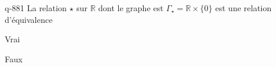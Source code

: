 \begin{truefalse}{q-881}
La relation $\star$ sur $\mathbb R$ dont le graphe est $\Gamma_\star=\mathbb R \times \{0\}$ est une relation d'équivalence
\item Vrai
\item* Faux
\end{truefalse}


